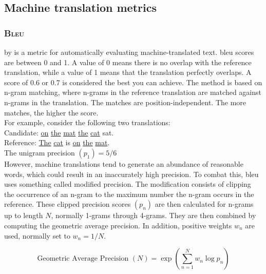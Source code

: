 \subsection{Machine translation metrics}
\label{sec:machine-translation-metrics}

\subsubsection{\textsc{Bleu}}
\label{sec:blue-score}
 by \textcite{papineni2002bleu} is a metric for automatically evaluating machine-translated text. \acrshort{bleu} scores are between 0 and 1. A value of 0 means there is no overlap with the reference translation, while a value of 1 means that the translation perfectly overlaps. A score of 0.6 or 0.7 is considered the best you can achieve. The method is based on n-gram matching, where n-grams in the reference translation are matched against n-grams in the translation. The matches are position-independent. The more matches, the higher the score.\\

\noindent For example, consider the following two translations:\\

\indent Candidate: \underline{on} \underline{the} \underline{mat} \underline{the} \underline{cat} sat.\\
\indent Reference: \underline{The} \underline{cat} is \underline{on} \underline{the} \underline{mat}.\\

\noindent The unigram precision \(\left(p_1\right) = 5/6\)\\

\noindent However, machine translations tend to generate an abundance of reasonable words, which could result in an inaccurately high precision. To combat this, \acrshort{bleu} uses something called modified precision. The modification consists of clipping the occurrence of an n-gram to the maximum number the n-gram occurs in the reference. These clipped precision scores \(\left(p_n\right)\) are then calculated for n-grams up to length \(N\), normally 1-grams through 4-grams. They are then combined by computing the geometric average precision. In addition, positive weights \(w_n\) are used, normally set to \(w_n = 1/N\).

\begin{equation}
    \label{eq:geometric-average-precision}
    \text{Geometric Average Precision $\left(N\right)$} = \exp \left( \sum_{n=1}^{N} w_n \log{p_n} \right)
\end{equation}

